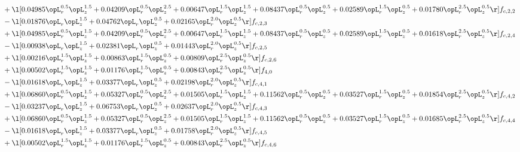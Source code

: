 \begin{alignat}{2}
& + \l[  0.04985 \opL_r^{0.5} \opL_z^{1.5} +  0.04209 \opL_r^{0.5} \opL_z^{2.5} +  0.00647 \opL_r^{1.5} \opL_z^{1.5} +  0.08437 \opL_r^{0.5} \opL_z^{0.5} +  0.02589 \opL_r^{1.5} \opL_z^{0.5} +  0.01780 \opL_r^{2.5} \opL_z^{0.5}  \r] f_{c,2,2} \nonumber \\ 
& - \l[  0.01876 \opL_r \opL_z^{1.5} +  0.04762 \opL_r \opL_z^{0.5} +  0.02165 \opL_r^{2.0} \opL_z^{0.5}  \r] f_{c,2,3} \nonumber \\ 
& + \l[  0.04985 \opL_r^{0.5} \opL_z^{1.5} +  0.04209 \opL_r^{0.5} \opL_z^{2.5} +  0.00647 \opL_r^{1.5} \opL_z^{1.5} +  0.08437 \opL_r^{0.5} \opL_z^{0.5} +  0.02589 \opL_r^{1.5} \opL_z^{0.5} +  0.01618 \opL_r^{2.5} \opL_z^{0.5}  \r] f_{c,2,4} \nonumber \\ 
& - \l[  0.00938 \opL_r \opL_z^{1.5} +  0.02381 \opL_r \opL_z^{0.5} +  0.01443 \opL_r^{2.0} \opL_z^{0.5}  \r] f_{c,2,5} \nonumber \\ 
& + \l[  0.00216 \opL_r^{1.5} \opL_z^{1.5} +  0.00863 \opL_r^{1.5} \opL_z^{0.5} +  0.00809 \opL_r^{2.5} \opL_z^{0.5}  \r] f_{c,2,6} \nonumber \\ 
& + \l[  0.00502 \opL_r^{1.5} \opL_z^{1.5} +  0.01176 \opL_r^{1.5} \opL_z^{0.5} +  0.00843 \opL_r^{2.5} \opL_z^{0.5}  \r] f_{4,0} \nonumber \\ 
& - \l[  0.01618 \opL_r \opL_z^{1.5} +  0.03377 \opL_r \opL_z^{0.5} +  0.02198 \opL_r^{2.0} \opL_z^{0.5}  \r] f_{c,4,1} \nonumber \\ 
& + \l[  0.06860 \opL_r^{0.5} \opL_z^{1.5} +  0.05327 \opL_r^{0.5} \opL_z^{2.5} +  0.01505 \opL_r^{1.5} \opL_z^{1.5} +  0.11562 \opL_r^{0.5} \opL_z^{0.5} +  0.03527 \opL_r^{1.5} \opL_z^{0.5} +  0.01854 \opL_r^{2.5} \opL_z^{0.5}  \r] f_{c,4,2} \nonumber \\ 
& - \l[  0.03237 \opL_r \opL_z^{1.5} +  0.06753 \opL_r \opL_z^{0.5} +  0.02637 \opL_r^{2.0} \opL_z^{0.5}  \r] f_{c,4,3} \nonumber \\ 
& + \l[  0.06860 \opL_r^{0.5} \opL_z^{1.5} +  0.05327 \opL_r^{0.5} \opL_z^{2.5} +  0.01505 \opL_r^{1.5} \opL_z^{1.5} +  0.11562 \opL_r^{0.5} \opL_z^{0.5} +  0.03527 \opL_r^{1.5} \opL_z^{0.5} +  0.01685 \opL_r^{2.5} \opL_z^{0.5}  \r] f_{c,4,4} \nonumber \\ 
& - \l[  0.01618 \opL_r \opL_z^{1.5} +  0.03377 \opL_r \opL_z^{0.5} +  0.01758 \opL_r^{2.0} \opL_z^{0.5}  \r] f_{c,4,5} \nonumber \\ 
& + \l[  0.00502 \opL_r^{1.5} \opL_z^{1.5} +  0.01176 \opL_r^{1.5} \opL_z^{0.5} +  0.00843 \opL_r^{2.5} \opL_z^{0.5}  \r] f_{c,4,6} \nonumber \\ 

\end{alignat}
